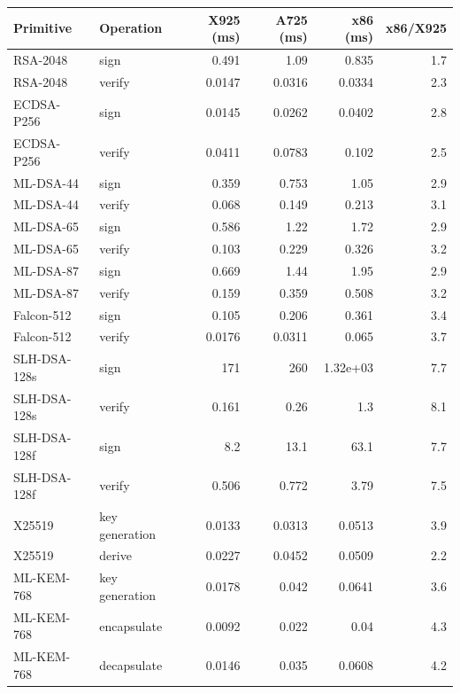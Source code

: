 \begin{tabular}{@{}llrrrr@{}}
\toprule
Primitive & Operation & X925 (ms) & A725 (ms) & x86 (ms) & x86/X925 \\
\midrule
RSA-2048 & sign & 0.491 & 1.09 & 0.835 & 1.7 \\
RSA-2048 & verify & 0.0147 & 0.0316 & 0.0334 & 2.3 \\
ECDSA-P256 & sign & 0.0145 & 0.0262 & 0.0402 & 2.8 \\
ECDSA-P256 & verify & 0.0411 & 0.0783 & 0.102 & 2.5 \\
ML-DSA-44 & sign & 0.359 & 0.753 & 1.05 & 2.9 \\
ML-DSA-44 & verify & 0.068 & 0.149 & 0.213 & 3.1 \\
ML-DSA-65 & sign & 0.586 & 1.22 & 1.72 & 2.9 \\
ML-DSA-65 & verify & 0.103 & 0.229 & 0.326 & 3.2 \\
ML-DSA-87 & sign & 0.669 & 1.44 & 1.95 & 2.9 \\
ML-DSA-87 & verify & 0.159 & 0.359 & 0.508 & 3.2 \\
Falcon-512 & sign & 0.105 & 0.206 & 0.361 & 3.4 \\
Falcon-512 & verify & 0.0176 & 0.0311 & 0.065 & 3.7 \\
SLH-DSA-128s & sign & 171 & 260 & 1.32e+03 & 7.7 \\
SLH-DSA-128s & verify & 0.161 & 0.26 & 1.3 & 8.1 \\
SLH-DSA-128f & sign & 8.2 & 13.1 & 63.1 & 7.7 \\
SLH-DSA-128f & verify & 0.506 & 0.772 & 3.79 & 7.5 \\
X25519 & key generation & 0.0133 & 0.0313 & 0.0513 & 3.9 \\
X25519 & derive & 0.0227 & 0.0452 & 0.0509 & 2.2 \\
ML-KEM-768 & key generation & 0.0178 & 0.042 & 0.0641 & 3.6 \\
ML-KEM-768 & encapsulate & 0.0092 & 0.022 & 0.04 & 4.3 \\
ML-KEM-768 & decapsulate & 0.0146 & 0.035 & 0.0608 & 4.2 \\
\bottomrule
\end{tabular}
